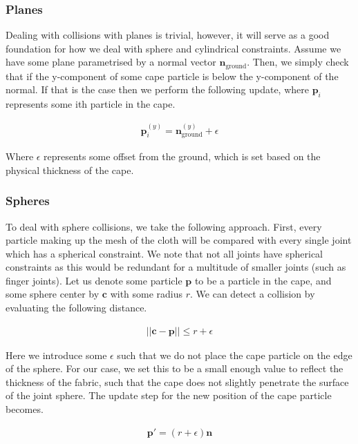 \documentclass{article}
\begin{document}
\subsubsection{Planes}

Dealing with collisions with planes is trivial, however, it will serve as a good foundation for how we deal with
sphere and cylindrical constraints. Assume we have some plane parametrised by a normal vector $\mathbf{n}_{\text{ground}}$.
Then, we simply check that if the y-component of some cape particle is below the y-component of the normal. If that is the
case then we perform the following update, where $\mathbf{p}_i$ represents some ith particle in the cape.

\begin{align}
  \mathbf{p}^{(y)}_i = \mathbf{n}^{(y)}_{\text{ground}} + \epsilon
\end{align}

Where $\epsilon$ represents some offset from the ground, which is set based on the physical thickness of the cape.

\subsubsection{Spheres}

To deal with sphere collisions, we take the following approach. First, every particle making up the mesh
of the cloth will be compared with every single joint which has a spherical constraint. We note that not
all joints have spherical constraints as this would be redundant for a multitude of smaller joints (such as
finger joints). Let us denote some particle $\mathbf{p}$ to be a particle in the cape, and some sphere center
by $\mathbf{c}$ with some radius $r$. We can detect a collision by evaluating the following distance.

\begin{align}
  ||\mathbf{c} - \mathbf{p}|| \leq r + \epsilon
\end{align}

Here we introduce some $\epsilon$ such that we do not place the cape particle on the edge of the sphere.
For our case, we set this to be a small enough value to reflect the thickness of the fabric, such that the
cape does not slightly penetrate the surface of the joint sphere. The update step for the new position of
the cape particle becomes.

\begin{align}
  \mathbf{p}' = (r + \epsilon) \mathbf{n}
\end{align}
\end{document}
